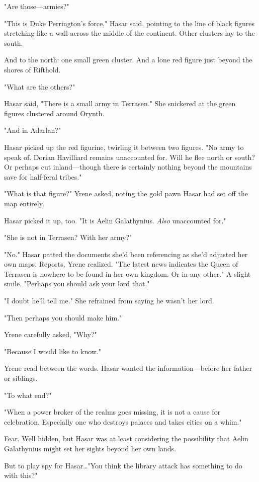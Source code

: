 "Are those---armies?"

"This is Duke Perrington's force," Hasar said, pointing to the line of black figures stretching like a wall across the middle of the continent.
Other clusters lay to the south.

And to the north: one small green cluster.
And a lone red figure just beyond the shores of Rifthold.

"What are the others?"

Hasar said, "There is a small army in Terrasen."
She snickered at the green figures clustered around Orynth.

"And in Adarlan?"

Hasar picked up the red figurine, twirling it between two figures.
"No army to speak of.
Dorian Havilliard remains unaccounted for.
Will he flee north or south?
Or perhaps cut inland---though there is certainly nothing beyond the mountains save for half-feral tribes."

"What is that figure?"
Yrene asked, noting the gold pawn Hasar had set off the map entirely.

Hasar picked it up, too.
"It is Aelin Galathynius.
\emph{Also}
unaccounted for."

"She is not in Terrasen?
With her army?"

"No."
Hasar patted the documents she'd been referencing as she'd adjusted her own maps.
Reports, Yrene realized.
"The latest news indicates the Queen of Terrasen is nowhere to be found in her own kingdom.
Or in any other."
A slight smile.
"Perhaps you should ask your lord that."

"I doubt he'll tell me."
She refrained from saying he wasn't her lord.

"Then perhaps you should make him."

Yrene carefully asked, "Why?"

"Because I would like to know."

Yrene read between the words.
Hasar wanted the information---before her father or siblings.

"To what end?"

"When a power broker of the realms goes missing, it is not a cause for celebration.
Especially one who destroys palaces and takes cities on a whim."

Fear.
Well hidden, but Hasar was at least considering the possibility that Aelin Galathynius might set her sights beyond her own lands.

But to play spy for Hasar\ldots "You think the library attack has something to do with this?"

